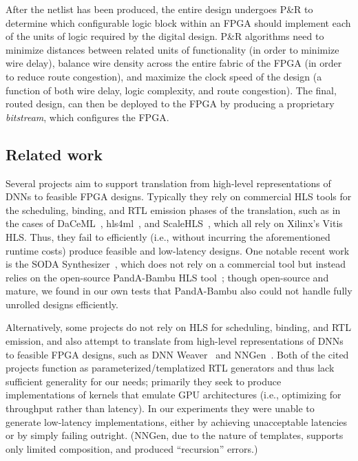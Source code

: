 \documentclass[10pt]{sig-alternate}
\begin{document}
After the netlist has been produced, the entire design undergoes P\&R to determine which configurable logic block within
an FPGA should implement each of the units of logic required by the
digital design. P\&R algorithms need to minimize distances between
related units of functionality (in order to minimize wire delay),
balance wire density across the entire fabric of the FPGA (in order
to reduce route congestion), and maximize the clock speed of the design
(a function of both wire delay, logic complexity, and route congestion).
The final, routed design, can then be deployed to the FPGA by producing
a proprietary \emph{bitstream}, which configures the FPGA.


\subsection{Related work}\label{subsec:relatedwork}

Several projects aim to support translation from high-level representations of DNNs to feasible FPGA designs. Typically they rely on commercial HLS tools for the scheduling, binding, and RTL emission phases of the translation, such as in the cases of DaCeML~\cite{daceml}, hls4ml~\cite{Duarte_2018}, and ScaleHLS~\cite{yehpca2022scalehls}, which all rely on Xilinx's Vitis HLS. Thus, they fail to efficiently (i.e., without incurring the aforementioned runtime costs) produce feasible and low-latency designs. One notable recent work is the SODA Synthesizer~\cite{9786533}, which does not rely on a commercial tool but instead relies on the open-source PandA-Bambu HLS tool~\cite{ferrandi2021bambu}; though open-source and mature, we found in our own tests that PandA-Bambu also could not handle fully unrolled designs efficiently.

Alternatively, some projects do not rely on HLS for scheduling, binding, and RTL emission, and also attempt to translate from high-level representations of DNNs to feasible FPGA designs, such as DNN Weaver~\cite{7783720} and NNGen~\cite{takamaeda2015pyverilog}. Both of the cited projects function as parameterized/templatized RTL generators and thus lack sufficient generality for our needs; primarily they seek to produce implementations of kernels that emulate GPU architectures (i.e., optimizing for throughput rather than latency).
In our experiments they were unable to generate low-latency implementations, either by achieving unacceptable latencies or by simply failing outright. (NNGen, due to the nature of templates, supports only limited composition, and produced ``recursion'' errors.)
\end{document}
